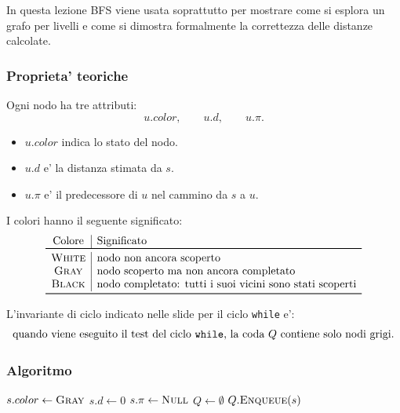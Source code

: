 In questa lezione BFS viene usata soprattutto per mostrare come si esplora un grafo per livelli e come si dimostra formalmente la correttezza delle distanze calcolate.

\subsubsection{Proprieta' teoriche}
Ogni nodo ha tre attributi:
\[
u.color,\qquad u.d,\qquad u.\pi.
\]

\begin{itemize}
	\item $u.color$ indica lo stato del nodo.
	\item $u.d$ e' la distanza stimata da $s$.
	\item $u.\pi$ e' il predecessore di $u$ nel cammino da $s$ a $u$.
\end{itemize}

I colori hanno il seguente significato:
\[
\begin{array}{c|l}
\text{Colore} & \text{Significato} \\
\toprule
\textsc{White} & \text{nodo non ancora scoperto} \\
\textsc{Gray} & \text{nodo scoperto ma non ancora completato} \\
\textsc{Black} & \text{nodo completato: tutti i suoi vicini sono stati scoperti} \\
\bottomrule
\end{array}
\]

L'invariante di ciclo indicato nelle slide per il ciclo \texttt{while} e':
\[
\text{quando viene eseguito il test del ciclo \texttt{while}, la coda }Q
\text{ contiene solo nodi grigi.}
\]

\subsubsection{Algoritmo}
\begin{algorithm}[H]
	\caption{\textsc{BFS}$(G,s)$}
	$s.color\gets\textsc{Gray}$\;
	$s.d\gets 0$\;
	$s.\pi\gets\textsc{Null}$\;
	$Q\gets\emptyset$
	$Q.\textsc{Enqueue}(s)$\;
\end{algorithm}

